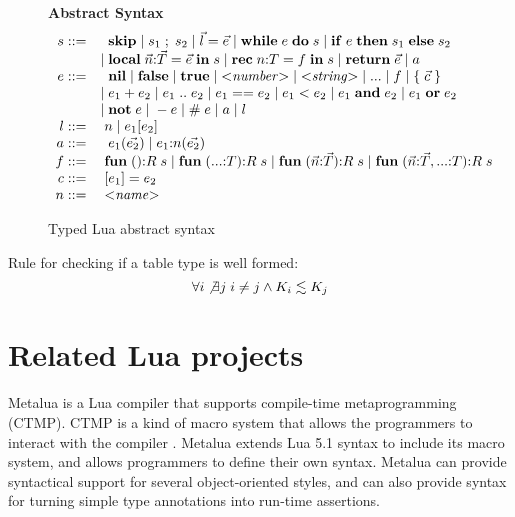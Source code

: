\begin{figure}[!ht]
\textbf{Abstract Syntax}\\
\dstart
$$
\begin{array}{rl}
s ::= & \;\; \mathbf{skip} \; | \;
s_{1} \; ; \; s_{2} \; | \;
\vec{l} = \vec{e}  \; | \;
\mathbf{while} \; e \; \mathbf{do} \; s \; | \;
\mathbf{if} \; e \; \mathbf{then} \; s_{1} \; \mathbf{else} \; s_{2}\\
& | \; \mathbf{local} \; \vec{n}{:}\vec{T} = \vec{e} \; \mathbf{in} \; s \; | \;
\mathbf{rec} \; n{:}T = f \; \mathbf{in} \; s \; | \;
\mathbf{return} \; \vec{e} \; | \;
a\\
e ::= & \;\; \mathbf{nil} \; | \;
\mathbf{false} \; | \;
\mathbf{true} \; | \;
{<}{\it number}{>} \; | \;
{<}{\it string}{>} \; | \;
{...} \; | \;
f \; | \;
\{ \; \vec{c}\; \} \\
& | \; e_{1} + e_{2} \; | \;
e_{1} \; {..} \; e_{2} \; | \;
e_{1} == e_{2} \; | \;
e_{1} < e_{2} \; | \;
e_{1} \; \mathbf{and} \; e_{2} \; | \;
e_{1} \; \mathbf{or} \; e_{2} \\
& | \; \mathbf{not} \; e \; | \;
- e \; | \;
\# \; e \; | \;
a \; | \;
l \\
l ::= & \; n \; | \;
e_{1}[e_{2}]\\
a ::= & \;\; e_{1}(\vec{e_{2}}) \; | \;
e_{1}{:}n(\vec{e_{2}})\\
f ::= & \; \mathbf{fun} \; (){:}R \; s \; | \;
\mathbf{fun} \; ({...}{:}T){:}R \; s \; | \;
\mathbf{fun} \; (\vec{n}{:}\vec{T}){:}R \; s \; | \;
\mathbf{fun} \; (\vec{n}{:}\vec{T},{...}{:}T){:}R \; s\\
c ::= & \; [e_{1}] = e_{2}\\
n ::= & \; {<}{\it name}{>}\\
\end{array}
$$
\dend
\caption{Typed Lua abstract syntax}
\label{fig:syntax}
\end{figure}

Rule for checking if a table type is well formed:
\[
\forall i \not\exists j \; i \not= j \wedge K_{i} \lesssim K_{j}
\]

\section{Related Lua projects}
\label{sec:related}

Metalua \citep{metalua} is a Lua compiler that supports compile-time
metaprogramming (CTMP).
CTMP is a kind of macro system that allows the programmers to interact
with the compiler \citep{fleutot2007contrasting}. 
Metalua extends Lua 5.1 syntax to include its macro system,
and allows programmers to define their own syntax.
Metalua can provide syntactical support for several object-oriented
styles, and can also provide syntax for turning simple type
annotations into run-time assertions.

